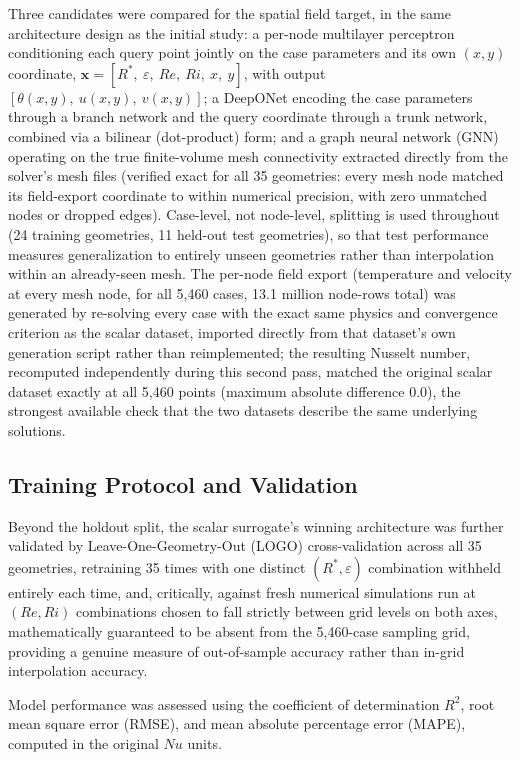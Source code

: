 Three candidates were compared for the spatial field target, in the same architecture design as the initial study: a per-node multilayer perceptron conditioning each query point jointly on the case parameters and its own $(x,y)$ coordinate, $\mathbf{x} = [R^\ast,\ \varepsilon,\ Re,\ Ri,\ x,\ y]$, with output $[\theta(x,y),\ u(x,y),\ v(x,y)]$; a DeepONet encoding the case parameters through a branch network and the query coordinate through a trunk network, combined via a bilinear (dot-product) form; and a graph neural network (GNN) operating on the true finite-volume mesh connectivity extracted directly from the solver's mesh files (verified exact for all 35 geometries: every mesh node matched its field-export coordinate to within numerical precision, with zero unmatched nodes or dropped edges). Case-level, not node-level, splitting is used throughout (24 training geometries, 11 held-out test geometries), so that test performance measures generalization to entirely unseen geometries rather than interpolation within an already-seen mesh. The per-node field export (temperature and velocity at every mesh node, for all 5,460 cases, 13.1 million node-rows total) was generated by re-solving every case with the exact same physics and convergence criterion as the scalar dataset, imported directly from that dataset's own generation script rather than reimplemented; the resulting Nusselt number, recomputed independently during this second pass, matched the original scalar dataset exactly at all 5,460 points (maximum absolute difference $0.0$), the strongest available check that the two datasets describe the same underlying solutions.

\subsection{Training Protocol and Validation}
\label{subsec:training}

Beyond the holdout split, the scalar surrogate's winning architecture was further validated by Leave-One-Geometry-Out (LOGO) cross-validation across all 35 geometries, retraining 35 times with one distinct $(R^\ast,\varepsilon)$ combination withheld entirely each time, and, critically, against fresh numerical simulations run at $(Re,Ri)$ combinations chosen to fall strictly between grid levels on both axes, mathematically guaranteed to be absent from the 5,460-case sampling grid, providing a genuine measure of out-of-sample accuracy rather than in-grid interpolation accuracy.

Model performance was assessed using the coefficient of determination $R^2$, root mean square error (RMSE), and mean absolute percentage error (MAPE), computed in the original $Nu$ units.

